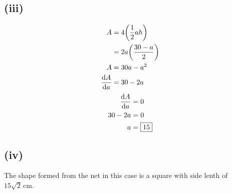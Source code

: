 \documentclass[a4paper,12pt]{article}
\begin{document}
\subsection*{(iii)}
\[\begin{aligned}
    A&=4\pqty{\frac12ah}\\
     &=2a\pqty{\frac{30-a}2}\\
    A&=30a-a^2\\
    \dv{A}{a}&=30-2a
\end{aligned}\]
\[\begin{aligned}
    \dv{A}{a}&=0\\
    30-2a&=0\\
    a&=\boxed{15}
\end{aligned}\]
\subsection*{(iv)}
The shape formed from the net in this case is a square with side lenth of \(15\sqrt2\,\text{cm}\).
\end{document}

